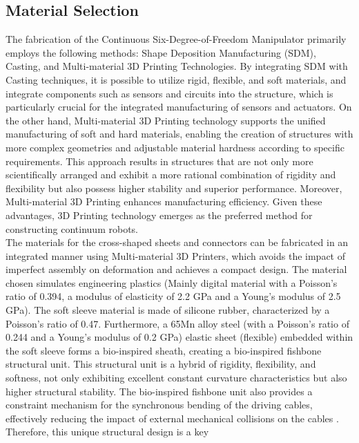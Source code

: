 \subsection{Material Selection}
The fabrication of the Continuous Six-Degree-of-Freedom Manipulator primarily employs the following methods: Shape 
Deposition Manufacturing (SDM)\cite{fast_and_robust}, Casting\cite{recipe2015,high_force}, and Multi-material 3D 
Printing Technologies\cite{evolution2016,3Dprint_design}. By integrating SDM with Casting techniques, it is possible 
to utilize rigid, flexible, and soft materials, and integrate components such as sensors and circuits into the structure, 
which is particularly crucial for the integrated manufacturing of sensors and actuators. On the other hand, Multi-material 
3D Printing technology supports the unified manufacturing of soft and hard materials, enabling the creation of structures 
with more complex geometries and adjustable material hardness according to specific requirements. This approach results 
in structures that are not only more scientifically arranged and exhibit a more rational combination of rigidity and 
flexibility but also possess higher stability and superior performance. Moreover, Multi-material 3D Printing enhances 
manufacturing efficiency. Given these advantages, 3D Printing technology emerges as the preferred method for constructing 
continuum robots. \\
The materials for the cross-shaped sheets and connectors can be fabricated in an integrated manner using Multi-material 
3D Printers, which avoids the impact of imperfect assembly on deformation and achieves a compact design. The material 
chosen simulates engineering plastics (Mainly digital material with a Poisson's ratio of 0.394, a modulus of elasticity 
of 2.2 GPa and a Young's modulus of 2.5 GPa). The soft sleeve material is made of silicone rubber, characterized by a 
Poisson's ratio of 0.47. Furthermore, a 65Mn alloy steel (with a Poisson's ratio of 0.244 and a Young's modulus of 0.2 
GPa) elastic sheet (flexible) embedded within the soft sleeve forms a bio-inspired sheath, creating a bio-inspired 
fishbone structural unit. This structural unit is a hybrid of rigidity, flexibility, and softness, not only exhibiting 
excellent constant curvature characteristics but also higher structural stability. The bio-inspired fishbone unit also 
provides a constraint mechanism for the synchronous bending of the driving cables, effectively reducing the impact of 
external mechanical collisions on the cables \cite{fishboneCR}. Therefore, this unique structural design is a key 
